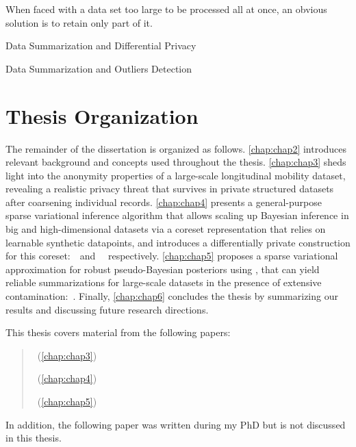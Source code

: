 When faced with a data set too large to be processed all at once, an obvious solution is to retain only part of it. 

\par{Data Summarization and Differential Privacy}

\par{Data Summarization and Outliers Detection}

\section{Thesis Organization}
\label{sec:thesis_organization}
The remainder of the dissertation is organized as follows. \cref{chap:chap2} introduces relevant background and concepts used throughout the thesis. \cref{chap:chap3} sheds light into the anonymity properties of a large-scale longitudinal mobility dataset, revealing a realistic privacy threat that survives in private structured datasets after coarsening individual records. \cref{chap:chap4} presents a general-purpose sparse variational inference algorithm that allows scaling up Bayesian inference in big and high-dimensional datasets via a coreset representation that relies on learnable synthetic datapoints, and introduces a differentially private construction for this coreset:~\psvi~and ~\dpsvi~respectively. \cref{chap:chap5} proposes a sparse variational approximation for robust pseudo-Bayesian posteriors using \bdiv, that can yield reliable summarizations for large-scale datasets in the presence of extensive contamination:~\bcores. Finally, \cref{chap:chap6} concludes the thesis by summarizing our results and discussing future research directions.


This thesis covers material from the following papers:

\begin{quote}
	~(\cref{chap:chap3})
	
	~(\cref{chap:chap4})
	
	~(\cref{chap:chap5})
\end{quote}


In addition, the following paper was written during my PhD but is not discussed in this thesis.

\begin{quote}
\end{quote}

